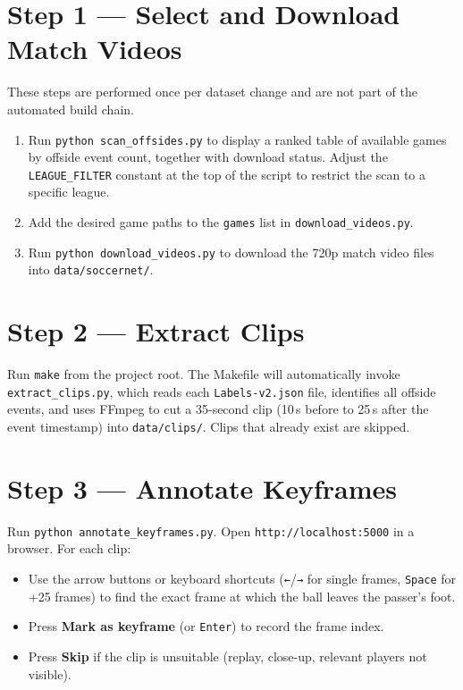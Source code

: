 \section*{Step 1 — Select and Download Match Videos}

These steps are performed once per dataset change and are not part of the automated build chain.

\begin{enumerate}
  \item Run \texttt{python scan\_offsides.py} to display a ranked table of available games
        by offside event count, together with download status. Adjust the \texttt{LEAGUE\_FILTER}
        constant at the top of the script to restrict the scan to a specific league.
  \item Add the desired game paths to the \texttt{games} list in \texttt{download\_videos.py}.
  \item Run \texttt{python download\_videos.py} to download the 720p match video files into
        \texttt{data/soccernet/}.
\end{enumerate}

\section*{Step 2 — Extract Clips}

Run \texttt{make} from the project root. The Makefile will automatically invoke \texttt{extract\_clips.py}, which reads each \texttt{Labels-v2.json} file, identifies all offside events, and uses FFmpeg to cut a 35-second clip (10\,s before to 25\,s after the event timestamp) into \texttt{data/clips/}. Clips that already exist are skipped.

\section*{Step 3 — Annotate Keyframes}

Run \texttt{python annotate\_keyframes.py}. Open \texttt{http://localhost:5000} in a browser. For each clip:

\begin{itemize}
  \item Use the arrow buttons or keyboard shortcuts (\texttt{←}/\texttt{→} for single frames, \texttt{Space} for +25 frames) to find the exact frame at which the ball leaves the passer's foot.
  \item Press \textbf{Mark as keyframe} (or \texttt{Enter}) to record the frame index.
  \item Press \textbf{Skip} if the clip is unsuitable (replay, close-up, relevant players not visible).
\end{itemize}

